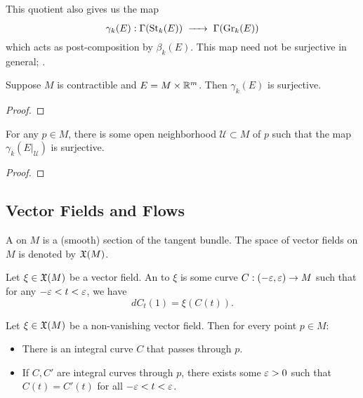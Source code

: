 \documentclass{lkx_paper}
\begin{document}
This quotient also gives us the map
\[
	\gamma_k(E) : \Gamma(\St_k(E)) \longto \Gamma(\Gr_k(E))
\]
which acts as post-composition by $\beta_{k}(E)$. This map need not be surjective in general; .

\begin{proposition}
	Suppose $M$ is contractible and $E=M\times \mathbb{R}^m$. Then $\gamma_k(E)$ is surjective.
\end{proposition}

\begin{proof}
\end{proof}

\begin{proposition}
	\label{local_section_lifting}
	For any $p\in M$, there is some open neighborhood $\mathcal{U}\subset M$ of $p$ such that the map $\gamma_k(E|_\mathcal{U})$ is surjective.
\end{proposition}

\begin{proof}
\end{proof}

\subsection{Vector Fields and Flows}

\begin{definition}
	A  on $M$ is a (smooth) section of the tangent bundle. The space of vector fields on $M$ is denoted by $\mathfrak{X}(M)$.
\end{definition}

\begin{definition}
	Let $\xi\in \mathfrak{X}(M)$ be a vector field. An  to $\xi$ is some curve $C : (-\varepsilon, \varepsilon) \to M$ such that for any $-\varepsilon < t < \varepsilon$, we have
	\[
		dC_t(1) = \xi(C(t)).
	\]
\end{definition}

\begin{proposition}
	Let $\xi\in \mathfrak{X}(M)$ be a non-vanishing vector field. Then for every point $p\in M$:
	\begin{itemize}
		\item There is an integral curve $C$ that passes through $p$.
		\item If $C, C'$ are integral curves through $p$, there exists some $\varepsilon>0$ such that $C(t)=C'(t)$ for all $-\varepsilon < t < \varepsilon$.
	\end{itemize}
\end{proposition}
\end{document}
